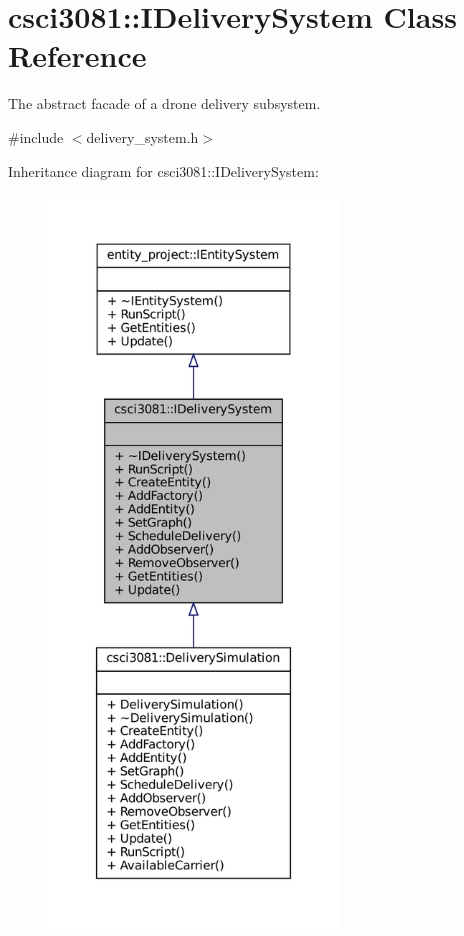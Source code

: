 \hypertarget{classcsci3081_1_1IDeliverySystem}{}\section{csci3081\+:\+:I\+Delivery\+System Class Reference}
\label{classcsci3081_1_1IDeliverySystem}


The abstract facade of a drone delivery subsystem.  




{\ttfamily \#include $<$delivery\+\_\+system.\+h$>$}



Inheritance diagram for csci3081\+:\+:I\+Delivery\+System\+:
\nopagebreak
\begin{figure}[H]
\begin{center}
\leavevmode
\includegraphics[height=550pt]{classcsci3081_1_1IDeliverySystem__inherit__graph}
\end{center}
\end{figure}
